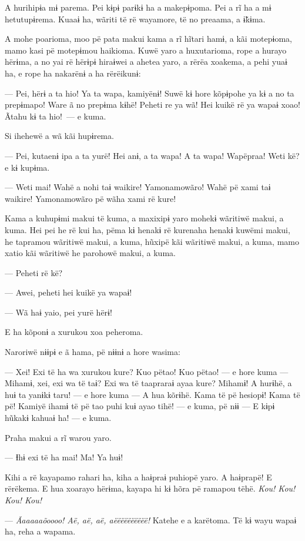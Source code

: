 A hurihipɨa mɨ parema. Pei kɨpɨ parɨkɨ ha a makepɨpoma. Pei a rĩ ha a mɨ
hetutupɨrema. Kuaaɨ ha, wãriti të rë wayamore, të no preaama, a ɨ̃kɨma. 

A mohe poarioma, moo pë pata makui kama a rĩ hĩtari hamɨ, a kãi
motepɨoma, mamo kasi pë motepɨmou haikioma. Kuwë yaro a huxutarioma,
rope a hurayo hërɨma, a no yai rë hërɨpɨ hiraɨwei a ahetea yaro, a rërëa
xoakema, a pehi yuaɨ ha, e rope ha nakarënɨ a ha rërëikunɨ:

--- Pei, hërɨ a ta hio! Ya ta wapa, kamiyënɨ! Suwë kɨ hore kõpɨpohe ya
 kɨ a no ta prepɨmapo! Ware ã no prepɨma kɨhë! Peheti re ya wã! Hei kuikë
 rë ya wapaɨ xoao! Ãtahu kɨ ta hio!~--- e kuma.

Si ihehewë a wã kãi hupɨrema. 

--- Pei, kutaenɨ ipa a ta yurë! Hei anɨ, a ta wapa! A ta wapa! Wapëpraa!
Weti kë? e kɨ kupɨma.

--- Weti mai! Wahë a nohi taɨ waikire! Yamonamowãro! Wahë pë xami taɨ
 waikire! Yamonamowãro pë wãha xami rë kure! 

Kama a kuhupɨmi makui të kuma, a maxixipɨ yaro mohekɨ wãritiwë makui, a
kuma. Hei pei he rë kui ha, pëma kɨ henakɨ rë kurenaha henakɨ kuwëmi
makui, he tapramou wãritiwë makui, a kuma, hũxipë kãi wãritiwë makui, a
kuma, mamo xatio kãi wãritiwë he parohowë makui, a kuma. 

--- Peheti rë kë?

--- Awei, peheti hei kuikë ya wapaɨ! 

--- Wã haɨ yaio, pei yurë hërɨ! 

E ha kõponɨ a xurukou xoa peheroma. 

Naroriwë nɨɨpɨ e ã hama, pë nɨɨnɨ a hore wasima: 

--- Xei! Exi të ha wa xurukou kure? Kuo pëtao! Kuo pëtao! --- e hore
kuma --- Mihamɨ, xei, exi wa të taɨ? Exi wa të taapraraɨ ayaa kure?
Mihamɨ! A hurɨhë, a huɨ ta yanɨkɨ taru! --- e hore kuma --- A hua
kõrɨhë. Kama të pë hesiopɨ! Kama të pë! Kamiyë ihamɨ të pë tao puhi kuɨ
ayao tihë! --- e kuma, pë nɨɨ --- E kɨpɨ hũkakɨ kahuaɨ ha! --- e kuma. 

Praha makui a rĩ warou yaro. 

--- Ɨhɨ exi të ha mai! Ma! Ya huɨ! 

Kihi a rë kayapamo rahari ha, kiha a haɨpraɨ puhiopë yaro. A haɨprapë! E
rërëkema. E hua xoarayo hërɨma, kayapa hi kɨ hõra pë ramapou tëhë. \textit{Kou! Kou! Kou! Kou!} 

--- \textit{Ãaaaaaõoooo! Aë, aë, aë, aëëëëëëëëëë!} Katehe e a
karëtoma. Të kɨ wayu wapaɨ ha, reha a wapama. 

